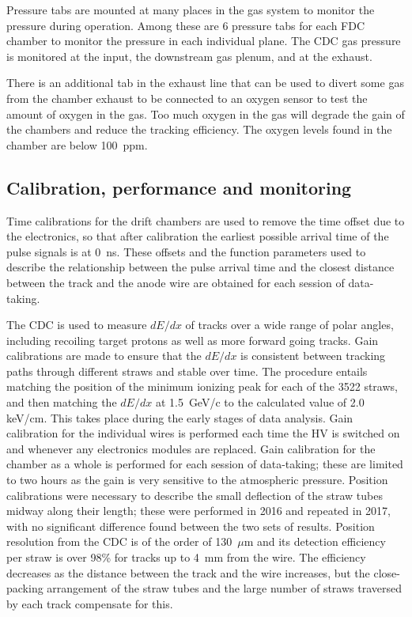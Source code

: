 Pressure tabs are mounted at many places in the gas system to monitor the pressure during operation. Among these are
6 pressure tabs for each FDC chamber to monitor the pressure in each individual plane. The CDC gas pressure is monitored
at the input, the downstream gas plenum, and at the exhaust.

There is an additional tab in the exhaust line that can be used to divert some gas from the chamber exhaust to be connected
to an oxygen sensor to test the amount of oxygen in the gas. Too much oxygen in the gas will degrade the gain of
the chambers and reduce the tracking efficiency. The oxygen levels found in the chamber are below 100~ppm. 

\subsection{Calibration, performance and monitoring \label{sec:dccalib}}
Time calibrations for the drift chambers are used to remove the time offset due to the electronics, so that after calibration the earliest possible arrival time of the pulse signals is at 0~ns. These offsets and the function parameters used to describe the relationship between the pulse arrival time and the closest distance between the track and the anode wire are obtained for each session of data-taking. 

The CDC is used to measure $dE/dx$ of tracks over a wide range of polar angles, including recoiling target protons as well as more forward going tracks. Gain calibrations are made to ensure that the $dE/dx$ is consistent between tracking paths through different straws and stable over time. 
The procedure entails matching the position of the minimum ionizing peak for each of the 3522 straws, and then matching the $dE/dx$ at 1.5~GeV/c to the calculated value of 2.0~ keV/cm. This takes place during the early stages of data analysis. Gain calibration for the individual wires is performed each time the HV is switched on and whenever any electronics modules are replaced. Gain calibration for the chamber as a whole is performed for each session of data-taking; these are limited to two hours as the gain is very sensitive to the atmospheric pressure. Position calibrations were necessary to describe the small deflection of the straw tubes midway along their length; these were performed in 2016 and repeated in 2017, with no significant difference found between the two sets of results.  Position resolution from the CDC is of the order of 130~$\mu$m and its detection efficiency per straw is over 98\% for tracks up to 4~mm from the wire. The efficiency decreases as the distance between the track and the wire increases, but the close-packing arrangement of the straw tubes and the large number of straws traversed by each track compensate for this. 

